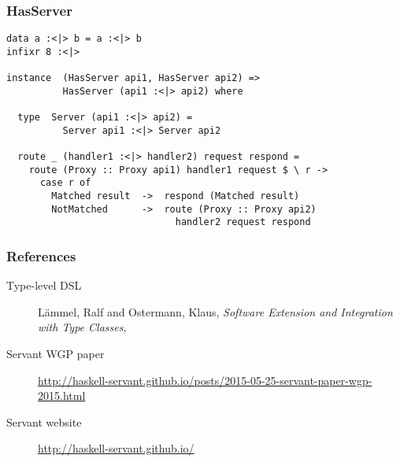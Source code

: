 \documentclass{beamer}
\begin{document}
\begin{frame}[fragile]
\frametitle{HasServer}
\begin{verbatim}
data a :<|> b = a :<|> b
infixr 8 :<|>

instance  (HasServer api1, HasServer api2) =>
          HasServer (api1 :<|> api2) where

  type  Server (api1 :<|> api2) =
          Server api1 :<|> Server api2

  route _ (handler1 :<|> handler2) request respond =
    route (Proxy :: Proxy api1) handler1 request $ \ r ->
      case r of
        Matched result  ->  respond (Matched result)
        NotMatched      ->  route (Proxy :: Proxy api2)
                              handler2 request respond
\end{verbatim}
\end{frame}

\begin{frame}
\frametitle{References}
\begin{description}
\item[Type-level DSL] L\"{a}mmel, Ralf and Ostermann, Klaus,
\textit{Software Extension and Integration with Type Classes},
\item[Servant WGP paper]
\url{http://haskell-servant.github.io/posts/2015-05-25-servant-paper-wgp-2015.html}
\item[Servant website] \url{http://haskell-servant.github.io/}
\end{description}
\end{frame}
\end{document}
